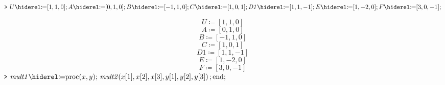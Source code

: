 \documentclass[11pt,a4paper,fleqn]{article}
\begin{document}
\begin{enumerate}[1.]
\begin{enumerate}[a.]
\begin{flushleft}
\begin{mdframed}
                \mapleinput
                {$ \displaystyle \texttt{>\,} \,U \coloneqq [1,1,0];A \coloneqq [0,1,0];B \coloneqq [-1,1,0];C \coloneqq [1,0,1];\mathit{D1} \coloneqq [1,1,-1];E \coloneqq [1,-2,0];F \coloneqq [3,0,-1]; $}

                \begin{dmath*}
                    U \coloneqq \left[1,1,0\right]
                \end{dmath*}
                \vspace{-\bigskipamount}
                \begin{dmath*}
                    A \coloneqq \left[0,1,0\right]
                \end{dmath*}
                \vspace{-\bigskipamount}
                \begin{dmath*}
                    B \coloneqq \left[-1,1,0\right]
                \end{dmath*}
                \vspace{-\bigskipamount}
                \begin{dmath*}
                    C \coloneqq \left[1,0,1\right]
                \end{dmath*}
                \vspace{-\bigskipamount}
                \begin{dmath*}
                    \mathit{D1} \coloneqq \left[1,1,-1\right]
                \end{dmath*}
                \vspace{-\bigskipamount}
                \begin{dmath*}
                    E \coloneqq \left[1,-2,0\right]
                \end{dmath*}
                \vspace{-\bigskipamount}
                \begin{dmath}\label{(4)}
                    F \coloneqq \left[3,0,-1\right]
                \end{dmath}
                \mapleinput
                {$ \displaystyle \texttt{>\,} \,\mathit{mult1} \coloneqq \mathrm{proc}(x ,y);\,\mathit{mult2} (x [1],x [2],x [3],y [1],y [2],y [3])\,;\mathrm{end};\, $}



\end{mdframed}
\end{flushleft}
\end{enumerate}
\end{enumerate}
\end{document}
